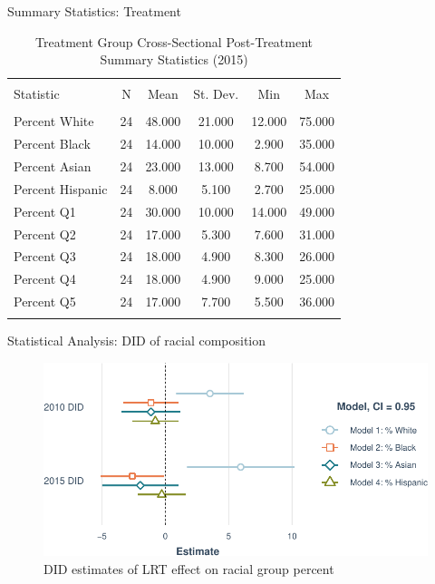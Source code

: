 \documentclass[11pt,ignorenonframetext,]{beamer}
\begin{document}
\begin{frame}{Summary Statistics: Treatment}
\protect\hypertarget{summary-statistics-treatment-1}{}

\begin{table}[!htbp] \centering 
  \caption{Treatment Group Cross-Sectional Post-Treatment Summary Statistics (2015)} 
  \label{} 
\begin{tabular}{@{\extracolsep{5pt}}lccccc} 
\\[-1.8ex]\hline 
\hline \\[-1.8ex] 
Statistic & \multicolumn{1}{c}{N} & \multicolumn{1}{c}{Mean} & \multicolumn{1}{c}{St. Dev.} & \multicolumn{1}{c}{Min} & \multicolumn{1}{c}{Max} \\ 
\hline \\[-1.8ex] 
Percent White & 24 & 48.000 & 21.000 & 12.000 & 75.000 \\ 
Percent Black & 24 & 14.000 & 10.000 & 2.900 & 35.000 \\ 
Percent Asian & 24 & 23.000 & 13.000 & 8.700 & 54.000 \\ 
Percent Hispanic & 24 & 8.000 & 5.100 & 2.700 & 25.000 \\ 
Percent Q1 & 24 & 30.000 & 10.000 & 14.000 & 49.000 \\ 
Percent Q2 & 24 & 17.000 & 5.300 & 7.600 & 31.000 \\ 
Percent Q3 & 24 & 18.000 & 4.900 & 8.300 & 26.000 \\ 
Percent Q4 & 24 & 18.000 & 4.900 & 9.000 & 25.000 \\ 
Percent Q5 & 24 & 17.000 & 7.700 & 5.500 & 36.000 \\ 
\hline \\[-1.8ex] 
\end{tabular} 
\end{table}

\end{frame}

\begin{frame}{Statistical Analysis: DID of racial composition}
\protect\hypertarget{statistical-analysis-did-of-racial-composition}{}

\begin{figure}
\centering
\includegraphics{csde_talk_files/figure-beamer/unnamed-chunk-11-1.pdf}
\caption{DID estimates of LRT effect on racial group percent}
\end{figure}

\end{frame}
\end{document}
